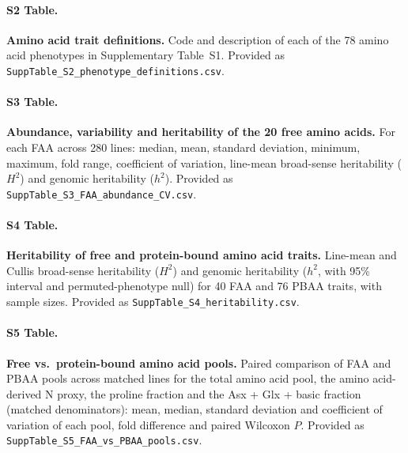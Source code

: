 \paragraph*{S2 Table.}
\makeatletter
\def\@currentlabelname{S2 Table}
\makeatother
\label{S2_Table}
\textbf{Amino acid trait definitions.} Code and description of each of the 78 amino acid phenotypes in Supplementary Table~S1. Provided as \texttt{SuppTable\_S2\_phenotype\_definitions.csv}.

\paragraph*{S3 Table.}
\makeatletter
\def\@currentlabelname{S3 Table}
\makeatother
\label{S3_Table}
\textbf{Abundance, variability and heritability of the 20 free amino acids.} For each FAA across 280 lines: median, mean, standard deviation, minimum, maximum, fold range, coefficient of variation, line-mean broad-sense heritability ($H^2$) and genomic heritability ($h^2$). Provided as \texttt{SuppTable\_S3\_FAA\_abundance\_CV.csv}.

\paragraph*{S4 Table.}
\makeatletter
\def\@currentlabelname{S4 Table}
\makeatother
\label{S4_Table}
\textbf{Heritability of free and protein-bound amino acid traits.} Line-mean and Cullis broad-sense heritability ($H^2$) and genomic heritability ($h^2$, with 95\% interval and permuted-phenotype null) for 40 FAA and 76 PBAA traits, with sample sizes. Provided as \texttt{SuppTable\_S4\_heritability.csv}.

\paragraph*{S5 Table.}
\makeatletter
\def\@currentlabelname{S5 Table}
\makeatother
\label{S5_Table}
\textbf{Free vs.\ protein-bound amino acid pools.} Paired comparison of FAA and PBAA pools across matched lines for the total amino acid pool, the amino acid-derived N proxy, the proline fraction and the Asx + Glx + basic fraction (matched denominators): mean, median, standard deviation and coefficient of variation of each pool, fold difference and paired Wilcoxon $P$. Provided as \texttt{SuppTable\_S5\_FAA\_vs\_PBAA\_pools.csv}.

